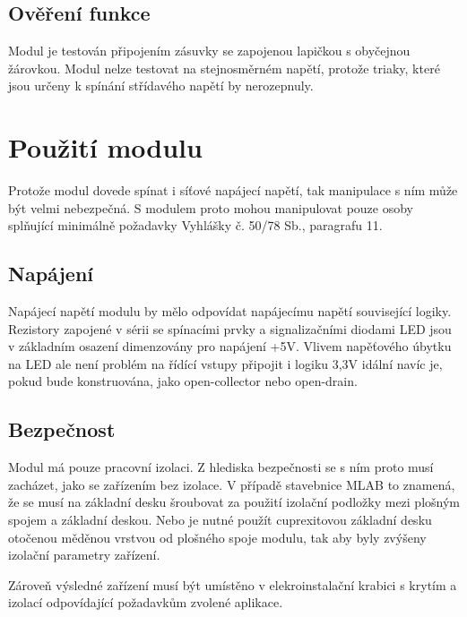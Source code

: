 \documentclass[12pt,a4paper,oneside]{article}
\begin{document}
\subsection{Ověření funkce}

Modul je testován připojením zásuvky se zapojenou lapičkou s obyčejnou žárovkou. Modul nelze testovat na stejnosměrném napětí, protože triaky, které jsou určeny k spínání střídavého napětí by nerozepnuly.

\section{Použití modulu}

Protože modul dovede spínat i síťové napájecí napětí, tak manipulace s ním může být velmi nebezpečná. S modulem proto mohou manipulovat pouze osoby splňující minimálně požadavky Vyhlášky č. 50/78 Sb., paragrafu 11.

\subsection{Napájení}

Napájecí napětí modulu by mělo odpovídat napájecímu napětí související
logiky. Rezistory zapojené v sérii se spínacími prvky a signalizačními diodami LED jsou v základním osazení dimenzovány pro napájení +5V. Vlivem napěťového úbytku na LED ale není problém na řídící vstupy připojit i logiku 3,3V idální navíc je, pokud bude konstruována, jako open-collector nebo open-drain.

\subsection{Bezpečnost}

Modul má pouze pracovní izolaci. Z hlediska bezpečnosti se s ním proto musí zacházet, jako se zařízením bez izolace. V případě stavebnice MLAB to znamená, že se musí na základní desku šroubovat za použití izolační podložky mezi plošným spojem a základní deskou. Nebo je nutné použít cuprexitovou základní desku otočenou měděnou vrstvou od plošného spoje modulu, tak aby byly zvýšeny izolační parametry zařízení. 

Zároveň výsledné zařízení musí být umístěno v elekroinstalační krabici s krytím a izolací odpovídající požadavkům zvolené aplikace. 
\end{document}
